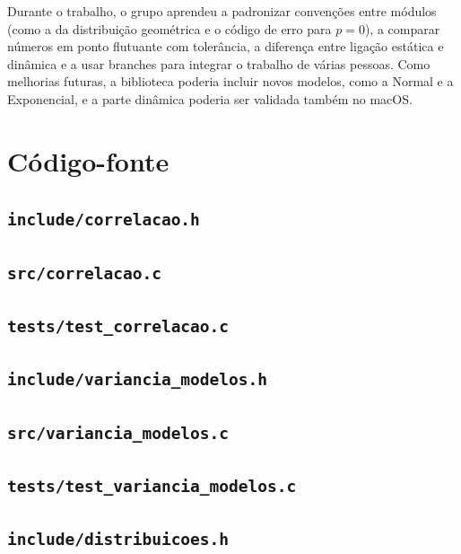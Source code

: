 \documentclass[12pt,a4paper]{article}
\newcommand{\cod}[1]{\texttt{#1}}
\newcommand{\fonte}[1]{}
\begin{document}
Durante o trabalho, o grupo aprendeu a padronizar convenções entre módulos (como a da distribuição geométrica e o código de erro para $p = 0$), a comparar números em ponto flutuante com tolerância, a diferença entre ligação estática e dinâmica e a usar branches para integrar o trabalho de várias pessoas. 
Como melhorias futuras, a biblioteca poderia incluir novos modelos, como a Normal e a Exponencial, e a parte dinâmica poderia ser validada também no macOS.

\appendix
\section{Código-fonte}
\subsection{\cod{include/correlacao.h}}
\fonte{../../include/correlacao.h}

\subsection{\cod{src/correlacao.c}}
\fonte{../../src/correlacao.c}

\subsection{\cod{tests/test\_correlacao.c}}
\fonte{../../tests/test_correlacao.c}
\subsection{\cod{include/variancia\_modelos.h}}
\fonte{../../include/variancia_modelos.h}

\subsection{\cod{src/variancia\_modelos.c}}
\fonte{../../src/variancia_modelos.c}

\subsection{\cod{tests/test\_variancia\_modelos.c}}
\fonte{../../tests/test_variancia_modelos.c}

\subsection{\cod{include/distribuicoes.h}}
\fonte{../../include/distribuicoes.h}
\end{document}
